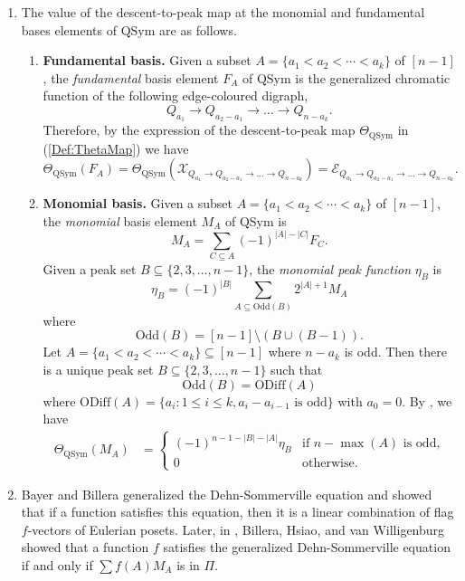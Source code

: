 \documentclass[11pt]{amsart}
\numberwithin{equation}{section}
\newcommand{\QSym}{\mathrm{QSym}}
\newcommand{\odd}{\mathrm{Odd}}
\newcommand{\oddd}{\mathrm{ODiff}}
\newcommand{\scrX}{{\mathscr{X}}}
\newcommand{\scrE}{{\mathscr{E}}}
\begin{document}
\begin{enumerate}[leftmargin=*]
\item The value of the descent-to-peak map at the monomial and fundamental bases elements of $\QSym$ are as follows. 
\begin{enumerate} 
\item {\bf Fundamental basis.}  
Given a subset $A=\{a_1<a_2<\cdots<a_{k}\}$ of $[n-1]$, the \emph{fundamental} basis element $F_A$ of $\QSym$ is the generalized chromatic function of the following edge-coloured digraph,
$$Q_{a_1}\rightarrow Q_{a_2-a_1}\rightarrow \dots \rightarrow Q_{n-a_k}.$$
Therefore, by the expression of the descent-to-peak map $\Theta_\QSym$ in (\ref{Def:ThetaMap}) we have
$$\Theta_{\QSym}(F_A)=\Theta_{\QSym}(\scrX_{Q_{a_1}\rightarrow Q_{a_2-a_1}\rightarrow \dots \rightarrow Q_{n-a_k}})=\scrE_{Q_{a_1}\rightarrow Q_{a_2-a_1}\rightarrow \dots \rightarrow Q_{n-a_k}}.$$
\item {\bf Monomial basis.} Given a subset $A=\{a_1<a_2<\cdots<a_{k}\}$ of $[n-1]$, the \emph{monomial} basis element $M_A$ of $\QSym$ is 
$$M_A=\sum_{C\subseteq A}(-1)^{|A|-|C|} F_C.$$  
Given a peak set $B\subseteq \{2,3,\dots,n-1\}$, the \emph{monomial peak function} $\eta_B$ is 
$$\eta_B=(-1)^{|B|}\sum_{A\subseteq \odd(B)}  2^{|A|+1}M_A$$ where  
$$\odd(B)=[n-1]\setminus (B\cup (B-1)).$$ 
Let $A=\{a_1<a_2<\cdots<a_k\}\subseteq [n-1]$ where $n-a_k$ is odd. Then there is a unique peak set $B\subseteq \{2,3,\dots,n-1\}$ such that 
$$\odd(B)=\oddd(A)$$ where 
$\oddd(A)=\{a_i:1\leq i\leq k, a_i-a_{i-1} \text{ is odd}\}$ with $a_0=0$. 
By \cite[Equation (4.9)]{A06}, we have 
\begin{align*}
\Theta_{\QSym}(M_A)
&=\begin{cases}
(-1)^{n-1-|B|-|A|} \eta_B & \text{if $n-\max(A)$ is odd,}\\
0 & \text{otherwise.}
\end{cases} 
\end{align*}


\end{enumerate}



\item Bayer and Billera \cite{BB85} generalized the Dehn-Sommerville equation and showed that if a function satisfies this equation, then it is a linear combination of flag $f$-vectors of Eulerian posets. Later, in \cite{B03}, Billera, Hsiao, and van Willigenburg showed that a function $f$ satisfies the generalized Dehn-Sommerville equation if and only if $\sum f(A)M_A$ is in $\Pi$. 









\end{enumerate}
\end{document}
